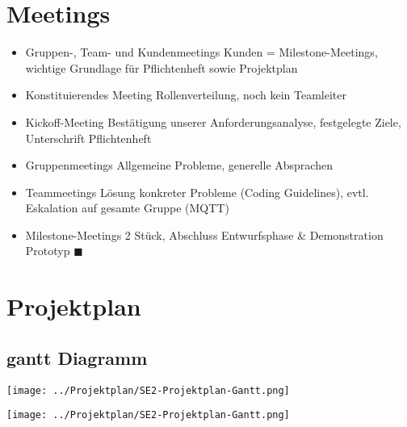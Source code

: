 \documentclass[ignorenonframetext, 11pt, table]{beamer}
\begin{document}
\section{Meetings}
\begin{frame}
	\begin{itemize}
		\item<1-> Gruppen-, Team- und Kundenmeetings
			 {Kunden = Milestone-Meetings, wichtige Grundlage für Pflichtenheft sowie Projektplan}
		\item<2-> Konstituierendes Meeting
			 {Rollenverteilung, noch kein Teamleiter}
		\item<3-> Kickoff-Meeting
			 {Bestätigung unserer Anforderungsanalyse, festgelegte Ziele, Unterschrift Pflichtenheft}
		\item<4-> Gruppenmeetings
			 {Allgemeine Probleme, generelle Absprachen}
		\item<5-> Teammeetings
			 {Lösung konkreter Probleme (Coding Guidelines), evtl. Eskalation auf gesamte Gruppe (MQTT)}
		\item<6-> Milestone-Meetings
			 {2 Stück, Abschluss Entwurfsphase \& Demonstration Prototyp $\blacksquare$}
	\end{itemize}
\end{frame}

\section{Projektplan}
\subsection{gantt Diagramm}
\begin{frame}
	\begin{flushleft}
	\texttt{[image: ../Projektplan/SE2-Projektplan-Gantt.png]}
	\end{flushleft}
	\begin{flushright}
	\texttt{[image: ../Projektplan/SE2-Projektplan-Gantt.png]}
	\end{flushright}
\end{frame}
\end{document}
